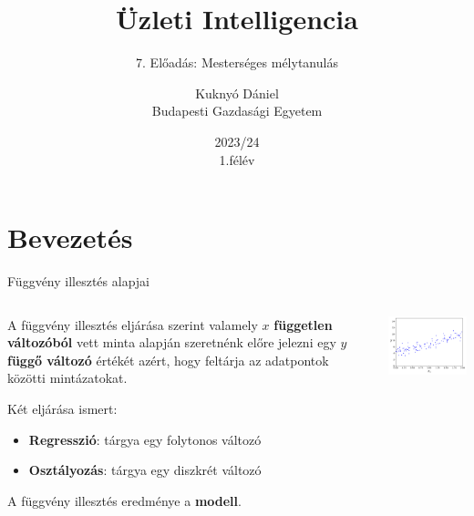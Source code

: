 \documentclass[english, aspectratio=169]{beamer}
\makeatletter
\newcommand\makebeamertitle{\frame{\maketitle}}
\let\origtableofcontents=\tableofcontents
\def\tableofcontents{\@ifnextchar[{\origtableofcontents}{\gobbletableofcontents}}
\def\gobbletableofcontents#1{\origtableofcontents}
\makeatother
\begin{document}
\section{Bevezetés}
\title[]{Üzleti Intelligencia}
\subtitle{7. Előadás: Mesterséges mélytanulás}
\author[Kuknyó Dániel]{Kuknyó Dániel\\Budapesti Gazdasági Egyetem}
\date{2023/24\\1.félév}
\makebeamertitle

\begin{frame}
\tableofcontents{}
\end{frame}

\begin{frame}
\tableofcontents[currentsection]
\end{frame}

\begin{frame}{Függvény illesztés alapjai}
	\begin{columns}
		\begin{column}{.5\textwidth}
			A függvény illesztés eljárása szerint valamely $x$ \textbf{független változóból} vett minta alapján szeretnénk előre jelezni egy $y$ \textbf{függő változó} értékét azért, hogy feltárja az adatpontok közötti mintázatokat.\par\smallskip
			Két eljárása ismert:
			\begin{itemize}
				\item \textbf{Regresszió}: tárgya egy folytonos változó
				\item \textbf{Osztályozás}: tárgya egy diszkrét változó
			\end{itemize}
			A függvény illesztés eredménye a \textbf{modell}.
		\end{column}
		\begin{column}{.5\textwidth}
			\begin{center}
				\includegraphics[width=7cm, keepaspectratio]{images/ql_8.png}
			\end{center}
		\end{column}
	\end{columns}
\end{frame}
\end{document}
